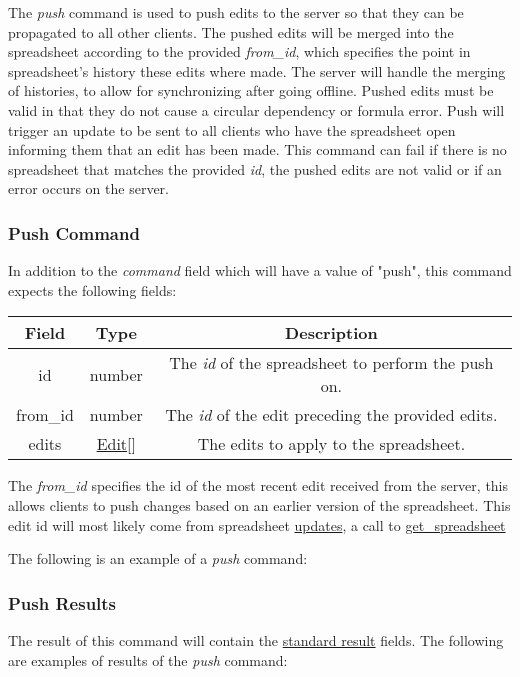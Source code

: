 The \emph{push} command is used to push edits to the server so that they can 
be propagated to all other clients. The pushed edits will be merged into the 
spreadsheet according to the provided \emph{from\_id}, which specifies the 
point in spreadsheet’s history these edits where made. The server will handle 
the merging of histories, to allow for synchronizing after going offline. 
Pushed edits must be valid in that they do not cause a circular dependency or 
formula error. Push will trigger an update to be sent to all clients who have 
the spreadsheet open informing them that an edit has been made. This command 
can fail if there is no spreadsheet that matches the provided \emph{id}, the 
pushed edits are not valid or if an error occurs on the server.

\subsubsection{Push Command}
In addition to the \emph{command} field which will have a value of "push", this command expects the following fields:
\begin{table}[H]
    \begin{center}
        \begin{tabular}{|c|c|c|}\hline
            Field & Type & Description \\\hline
            id & number & The \emph{id} of the spreadsheet to perform the push on. \\\hline
            from\_id & number & The \emph{id} of the edit preceding the provided edits. \\\hline
            edits & \hyperref[sec:message:edits]{Edit}[] & The edits to apply to the spreadsheet. \\\hline
        \end{tabular}
    \end{center}
\end{table}
The \emph{from\_id} specifies the id of the most recent edit received from the server, this allows clients to push changes
based on an earlier version of the spreadsheet. This edit id will most likely come from spreadsheet \hyperref[lst:update:edits]{updates},
a call to \hyperref[sec:message:get_spreadsheet]{get\_spreadsheet}

The following is an example of a \emph{push} command:


\subsubsection{Push Results}
The result of this command will contain the \hyperref[sec:message:result]{standard result} fields.
The following are examples of results of the \emph{push} command:



